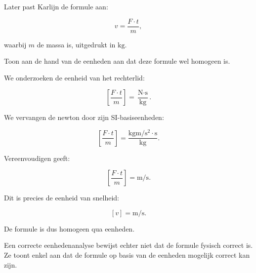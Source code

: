 \documentclass{ximera}
\begin{document}
\begin{oefening}{\oefB\ESS}
Later past Karlijn de formule aan:

\[
v = \frac{F \cdot t}{m},
\]

waarbij $m$ de massa is, uitgedrukt in $\si{\kilogram}$.

\begin{question}
Toon aan de hand van de eenheden aan dat deze formule wel homogeen is.

\begin{oplossing}
We onderzoeken de eenheid van het rechterlid:

\[
\left[\frac{F \cdot t}{m}\right]
=
\frac{\si{\newton}\cdot\si{\second}}
{\si{\kilogram}}.
\]

We vervangen de newton door zijn SI-basiseenheden:

\[
\left[\frac{F \cdot t}{m}\right]
=
\frac{
\si{\kilogram\meter\per\second\squared}
\cdot
\si{\second}
}{
\si{\kilogram}
}.
\]

Vereenvoudigen geeft:

\[
\left[\frac{F \cdot t}{m}\right]
=
\si{\meter\per\second}.
\]

Dit is precies de eenheid van snelheid:

\[
[v]
=
\si{\meter\per\second}.
\]

De formule is dus homogeen qua eenheden.

Een correcte eenhedenanalyse bewijst echter niet dat de formule fysisch correct is.
Ze toont enkel aan dat de formule op basis van de eenheden mogelijk correct kan zijn.
\end{oplossing}
\end{question}

\end{oefening}
\end{document}
